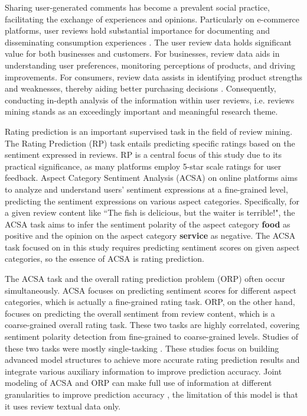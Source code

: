 \documentclass[preprint,12pt]{elsarticle}
\begin{document}
Sharing user-generated comments has become a prevalent social practice, facilitating the exchange of experiences and opinions. Particularly on e-commerce platforms, user reviews hold substantial importance for documenting and disseminating consumption experiences \citep{pang2008opinion,liu2022sentiment}. The user review data holds significant value for both businesses and customers. For businesses, review data aids in understanding user preferences, monitoring perceptions of products, and driving improvements. For consumers, review data assists in identifying product strengths and weaknesses, thereby aiding better purchasing decisions \citep{liu2020sentiment,hu2004mining,wu2024decision}. Consequently, conducting in-depth analysis of the information within user reviews, i.e. reviews mining stands as an exceedingly important and meaningful research theme.

Rating prediction is an important supervised task in the field of review mining. The Rating Prediction (RP) task entails predicting specific ratings based on the sentiment expressed in reviews. RP is a central focus of this study due to its practical significance, as many platforms employ 5-star scale ratings for user feedback. Aspect Category Sentiment Analysis (ACSA) on online platforms aims to analyze and understand users' sentiment expressions at a fine-grained level, predicting the sentiment expressions on various aspect categories. Specifically, for a given review content like ``The fish is delicious, but the waiter is terrible!", the ACSA task aims to infer the sentiment polarity of the aspect category \textbf{food} as positive and the opinion on the aspect category \textbf{service} as negative. The ACSA task focused on in this study requires predicting sentiment scores on given aspect categories, so the essence of ACSA is rating prediction. 

The ACSA task and the overall rating prediction problem (ORP) often occur simultaneously. ACSA focuses on predicting sentiment scores for different aspect categories, which is actually a fine-grained rating task. ORP, on the other hand, focuses on predicting the overall sentiment from review content, which is a coarse-grained overall rating task. These two tasks are highly correlated, covering sentiment polarity detection from fine-grained to coarse-grained levels. Studies of these two tasks were mostly single-tasking \citep{seo2017interpretable,li2011incorporating,tang2015user,zhang2016collaborative}. These studies focus on building advanced model structures to achieve more accurate rating prediction results and integrate various auxiliary information to improve prediction accuracy. Joint modeling of ACSA and ORP can make full use of information at different granularities to improve prediction accuracy \citep{bu2021asap}, the limitation of this model is that it uses review textual data only.
\end{document}
